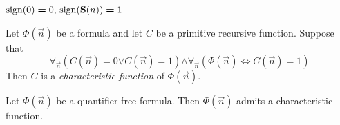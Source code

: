 \documentclass[10pt]{amsart}
\newcommand{\mforall}{\boldsymbol{\forall}}
\newcommand{\mequiv}{\boldsymbol{\Leftrightarrow}}
\newcommand{\mand}{\boldsymbol{\wedge}}
\newcommand{\mor}{\boldsymbol{\vee}}
\newcommand{\meq}{\boldsymbol{=}}
\begin{document}
\begin{definition}
	$\mathrm{sign}(0) \meq 0,\,\mathrm{sign}(\bd{S}(n)) \meq 1$
\end{definition}

\begin{definition}
	Let $\Phi(\vec{n})$ be a formula and let $C$ be a primitive recursive function. Suppose that
	$$\mforall_{\vec{n}}\left(C(\vec{n}) \meq 0 \mor C(\vec{n}) \meq 1\right) \mand \mforall_{\vec{n}}\left(\Phi(\vec{n}) \mequiv C(\vec{n}) \meq 1\right)$$
	Then $C$ is a \textit{characteristic function} of $\Phi(\vec{n})$.
\end{definition}

\begin{theorem}\label{theorem:each_quantifier_free_formula_is_primitive_recursive}
	Let $\Phi(\vec{n})$ be a quantifier-free formula. Then $\Phi(\vec{n})$ admits a characteristic function.
\end{theorem}
\end{document}
